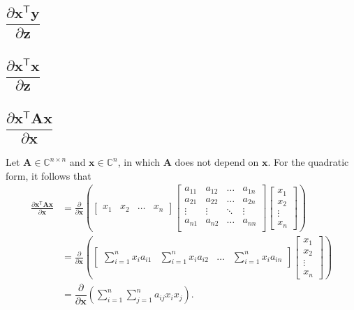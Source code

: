 \documentclass{article}
\newcommand{\trans}{\mathsf{T}}
\begin{document}
\subsection{\(\dfrac{\partial \mathbf{x}^\trans \mathbf{y}}{\partial \mathbf{z}}\)}

\subsection{\(\dfrac{\partial \mathbf{x}^\trans \mathbf{x}}{\partial \mathbf{z}}\)}

\subsection{\(\dfrac{\partial \mathbf{x}^\trans \mathbf{A} \mathbf{x}}{\partial \mathbf{x}}\)}
Let \(\mathbf{A}\in \mathbb{C}^{n\times n}\) and \(\mathbf{x} \in \mathbb{C}^{n}\), in which \(\mathbf{A}\) does not depend on \(\mathbf{x}\). For the quadratic form, it follows that
\begin{align}
    \frac{\partial \mathbf{x}^\trans \mathbf{A} \mathbf{x}}{\partial \mathbf{x}} &= \frac{\partial}{\partial \mathbf{x}} \left(
    \begin{bmatrix}
        x_{1} & x_{2} & \dots & x_{n}
    \end{bmatrix}
    \begin{bmatrix}
        a_{11} & a_{12} & \dots & a_{1n} \\
        a_{21} & a_{22} & \dots & a_{2n} \\
        \vdots & \vdots & \ddots & \vdots \\
        a_{n1} & a_{n2} & \dots & a_{nn} \\
    \end{bmatrix} \begin{bmatrix}
        x_{1} \\ x_{2} \\ \vdots \\ x_{n}
    \end{bmatrix} \right) \\
    &= \frac{\partial}{\partial \mathbf{x}} \left(
			\begin{bmatrix}
				\displaystyle \sum_{i = 1}^{n} x_{i}a_{i1} & 
				\displaystyle \sum_{i = 1}^{n} x_{i}a_{i2} & 
				\dots & 
				\displaystyle \sum_{i = 1}^{n} x_{i}a_{in}
			\end{bmatrix} \begin{bmatrix}
				x_{1} \\ x_{2} \\ \vdots \\ x_{n}
			\end{bmatrix} \right) \\
            &= \dfrac{\partial}{\partial \mathbf{x}} \left(
				\sum_{i = 1}^{n}\sum_{j = 1}^{n} a_{ij} x_{i} x_{j}
			\right).
\end{align}
\end{document}
